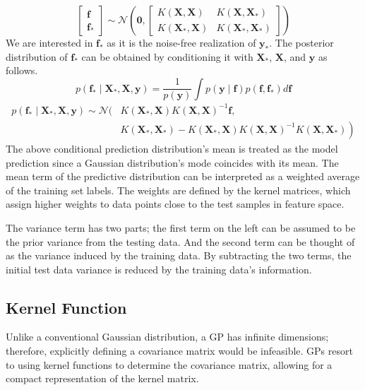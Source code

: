 \documentclass[letterpaper,11pt]{extarticle}
\begin{document}
$$
\left[\begin{array}{l}
\mathbf{f} \\
\mathbf{f}_{*}
\end{array}\right] \sim \mathcal{N}\left(\mathbf{0},\left[\begin{array}{ll}
K(\mathbf{X}, \mathbf{X}) & K\left(\mathbf{X}, \mathbf{X}_{*}\right) \\
K\left(\mathbf{X}_{*}, \mathbf{X}\right) & K\left(\mathbf{X}_{*}, \mathbf{X}_{*}\right)
\end{array}\right]\right)
$$
We are interested in $\mathbf{f}_*$ as it is the noise-free realization of $\mathbf{y}_*$. The posterior distribution of $\mathbf{f}_*$ can be obtained by conditioning it with $\mathbf{X}_*$, $\mathbf{X}$, and $\mathbf{y}$ as follows. 
$$
p(\mathbf{f_*} \mid \mathbf{X}_*, \mathbf{X}, \mathbf{y}) = \frac{1}{p({\mathbf{y}})} \int p(\mathbf{y} \mid \mathbf{f}) p(\mathbf{f}, \mathbf{f_*}) d \mathbf{f}
$$
$$
\begin{aligned}
p(\mathbf{f_*} \mid \mathbf{X}_*, \mathbf{X}, \mathbf{y}) \sim \mathcal{N}(& K\left(\mathbf{X}_{*}, \mathbf{X}\right) K(\mathbf{X}, \mathbf{X})^{-1} \mathbf{f}, \\
&\left.K\left(\mathbf{X}_{*}, \mathbf{X}_{*}\right)-K\left(\mathbf{X}_{*}, \mathbf{X}\right) K(\mathbf{X}, \mathbf{X})^{-1} K\left(\mathbf{X}, \mathbf{X}_{*}\right)\right)
\end{aligned}
$$
The above conditional prediction distribution's mean is treated as the model prediction since a Gaussian distribution's mode coincides with its mean. The mean term of the predictive distribution can be interpreted as a weighted average of the training set labels. The weights are defined by the kernel matrices, which assign higher weights to data points close to the test samples in feature space. 

The variance term has two parts; the first term on the left can be assumed to be the prior variance from the testing data. And the second term can be thought of as the variance induced by the training data. By subtracting the two terms, the initial test data variance is reduced by the training data's information. 

\subsection{Kernel Function}
Unlike a conventional Gaussian distribution, a GP has infinite dimensions; therefore, explicitly defining a covariance matrix would be infeasible. GPs resort to using kernel functions to determine the covariance matrix, allowing for a compact representation of the kernel matrix. 
\end{document}
